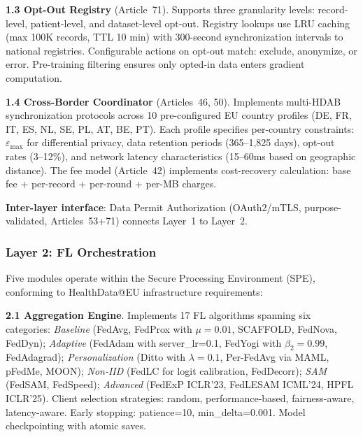 \documentclass[conference]{IEEEtran}
\begin{document}
\textbf{1.3 Opt-Out Registry} (Article~71). Supports three granularity levels: record-level, patient-level, and dataset-level opt-out. Registry lookups use LRU caching (max 100K records, TTL 10 min) with 300-second synchronization intervals to national registries. Configurable actions on opt-out match: exclude, anonymize, or error. Pre-training filtering ensures only opted-in data enters gradient computation.

\textbf{1.4 Cross-Border Coordinator} (Articles~46, 50). Implements multi-HDAB synchronization protocols across 10 pre-configured EU country profiles (DE, FR, IT, ES, NL, SE, PL, AT, BE, PT). Each profile specifies per-country constraints: $\varepsilon_{\max}$ for differential privacy, data retention periods (365--1,825 days), opt-out rates (3--12\%), and network latency characteristics (15--60ms based on geographic distance). The fee model (Article~42) implements cost-recovery calculation: base fee + per-record + per-round + per-MB charges.

\textbf{Inter-layer interface}: Data Permit Authorization (OAuth2/mTLS, purpose-validated, Articles~53+71) connects Layer~1 to Layer~2.

\subsubsection{Layer 2: FL Orchestration}

Five modules operate within the Secure Processing Environment (SPE), conforming to HealthData@EU infrastructure requirements:

\textbf{2.1 Aggregation Engine}. Implements 17 FL algorithms spanning six categories: \textit{Baseline} (FedAvg, FedProx with $\mu{=}0.01$, SCAFFOLD, FedNova, FedDyn); \textit{Adaptive} (FedAdam with server\_lr=0.1, FedYogi with $\beta_2{=}0.99$, FedAdagrad); \textit{Personalization} (Ditto with $\lambda{=}0.1$, Per-FedAvg via MAML, pFedMe, MOON); \textit{Non-IID} (FedLC for logit calibration, FedDecorr); \textit{SAM} (FedSAM, FedSpeed); \textit{Advanced} (FedExP ICLR'23, FedLESAM ICML'24, HPFL ICLR'25). Client selection strategies: random, performance-based, fairness-aware, latency-aware. Early stopping: patience=10, min\_delta=0.001. Model checkpointing with atomic saves.
\end{document}
